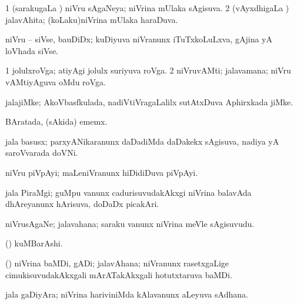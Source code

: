 \bentry
{} 
\gl{\gu}
\expl{}
\bmng
\bnum
\num{1} (sarakugaLa \vi) niVru sAgaNeya; niVrina mUlaka sAgisuva. 
\num{2} (vAyxdhigaLa \vi) jalavAhita; (koLaku)niVrina mUlaka haraDuva. 
\enum
\emng
\eentry

\bentry
{} 
\gl{\nA}
\expl{}
\bmng
niVru -- siVse, bauDiDx; kuDiyuva niVranunx iTuTxkoLuLxva, gAjina yA loVhada siVse. 
\emng
\eentry

\bentry
{} 
\gl{\nA}
\expl{}
\bmng
\bnum
\num{1} jolulxroVga; atiyAgi jolulx suriyuva roVga. 
\num{2} niVruvAMti; jalavamana; niVru vAMtiyAguva oMdu roVga. 
\enum
\emng
\eentry

\bentry
{} 
\gl{\nA}
\bmng
jalajiMke; AkoVbasfkulada, nadiVtiVragaLalilx sutAtxDuva Aphirxkada jiMke.  
\emng
\eentry

\bentry
{} 
\gl{\nA}
\bmng
BAratada, (sAkida) ememx.  
\emng
\eentry

\bentry
{} 
\gl{\nA}
\expl{}
\bmng
jala basusx; parxyANikaranunx daDadiMda daDakekx sAgisuva, nadiya yA saroVvarada doVNi. 
\emng
\eentry

\bentry
{} 
\gl{\nA}
\expl{}
\bmng
niVru piVpAyi; maLeniVranunx hiDidiDuva piVpAyi. 
\emng
\eentry

\bentry
{} 
\gl{\nA}
\expl{}
\bmng
jala PiraMgi; guMpu \mo vanunx cadurisuvudakAkxgi niVrina balavAda dhAreyanunx hArisuva, doDaDx picakAri. 
\emng
\eentry

\bentry
{} 
\gl{\nA}
\expl{}
\bmng
niVrusAgaNe; jalavahana; saraku \mo vanunx niVrina meVle sAgisuvudu. 
\emng
\eentry

\bentry
{} 
\gl{\nA}
\expl{}
\bmng
(\Kavi) kuMBarAshi. 
\emng
\eentry

\bentry
{} 
\gl{\nA}
\expl{}
\bmng
(\kanmu) niVrina baMDi, gADi; jalavAhana; niVranunx rasetxgaLige cimukisuvudakAkxgali mArATakAkxgali hotutxtaruva baMDi. 
\emng
\eentry

\bentry
{} 
\gl{\nA}
\bmng
jala gaDiyAra; niVrina hariviniMda kAlavanunx aLeyuva sAdhana.  
\emng
\eentry

